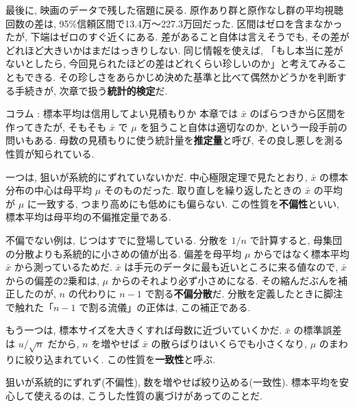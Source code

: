     最後に, 映画のデータで残した宿題に戻る.
    原作あり群と原作なし群の平均視聴回数の差は, 95\%信頼区間で13.4万〜227.3万回だった.
    区間はゼロを含まなかったが, 下端はゼロのすぐ近くにある.
    差があること自体は言えそうでも, その差がどれほど大きいかはまだはっきりしない.
    同じ情報を使えば, 「もし本当に差がないとしたら, 今回見られたほどの差はどれくらい珍しいのか」と考えてみることもできる.
    その珍しさをあらかじめ決めた基準と比べて偶然かどうかを判断する手続きが, 次章で扱う\textbf{統計的検定}だ.

  \begin{mybox}{コラム : 標本平均は信用してよい見積もりか}
    本章では $\bar{x}$ のばらつきから区間を作ってきたが, そもそも $\bar{x}$ で $\mu$ を狙うこと自体は適切なのか, という一段手前の問いもある.
    母数の見積もりに使う統計量を\textbf{推定量}と呼び, その良し悪しを測る性質が知られている.

    一つは, 狙いが系統的にずれていないかだ.
    中心極限定理で見たとおり, $\bar{x}$ の標本分布の中心は母平均 $\mu$ そのものだった.
    取り直しを繰り返したときの $\bar{x}$ の平均が $\mu$ に一致する, つまり高めにも低めにも偏らない.
    この性質を\textbf{不偏性}といい, 標本平均は母平均の不偏推定量である.

    不偏でない例は, じつはすでに登場している.
    分散を $1/n$ で計算すると, 母集団の分散よりも系統的に小さめの値が出る.
    偏差を母平均 $\mu$ からではなく標本平均 $\bar{x}$ から測っているためだ.
    $\bar{x}$ は手元のデータに最も近いところに来る値なので, $\bar{x}$ からの偏差の2乗和は, $\mu$ からのそれより必ず小さめになる.
    その縮んだぶんを補正したのが, $n$ の代わりに $n-1$ で割る\textbf{不偏分散}だ.
    分散を定義したときに脚注で触れた「$n-1$ で割る流儀」の正体は, この補正である.

    もう一つは, 標本サイズを大きくすれば母数に近づいていくかだ.
    $\bar{x}$ の標準誤差は $u/\sqrt{n}$ だから, $n$ を増やせば $\bar{x}$ の散らばりはいくらでも小さくなり, $\mu$ のまわりに絞り込まれていく.
    この性質を\textbf{一致性}と呼ぶ.

    狙いが系統的にずれず(不偏性), 数を増やせば絞り込める(一致性).
    標本平均を安心して使えるのは, こうした性質の裏づけがあってのことだ.
  \end{mybox}
